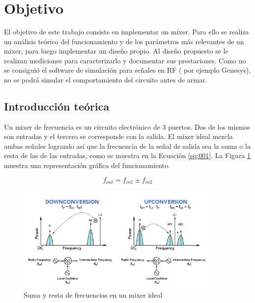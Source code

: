 \documentclass[a4paper,10pt]{article}
\title{  }
\begin{document}
	\maketitle %
	\newpage

	\tableofcontents %
	\newpage


\section{Objetivo}
\indent El objetivo de este trabajo consiste en implementar un mixer. Para ello 
se realiza un an\'alisis te\'orico del funcionamiento y de los par\'ametros 
m\'as relevantes de un mixer, para luego implementar un dise\~no propio. Al 
dise\~no propuesto se le realizan mediciones para caracterizarlo y documentar 
sus prestaciones.
\indent Como no se consiguió el software de simulación para señales en RF (
por ejemplo Genesys), no se podrá simular el comportamiento del circuito antes 
de armar.

\newpage
\subsection{Introducción teórica}
	\indent Un mixer de frecuencia es un circuito electrónico de 3 puertos. Dos
	de los mismos son entradas y el tercero se corresponde con la salida. El 
	mixer ideal mezcla ambas señales logrando así que la frecuencia de la señal 
	de salida sea la suma o la resta de las de las entradas, como se muestra en 
	la Ecuación \ref{eq:001}. La Figura \ref{img:001} muestra una representación
	gráfica del funcionamiento.
	
	\begin{equation}\label{eq:001}
		f_{out} = f_{in1} \pm f_{in2}
	\end{equation}

	\begin{figure}[!htb]
		\centering
		\includegraphics[width=10cm]
		{Images/MixerFunction.png}
		\caption{Suma y resta de frecuencias en un mixer ideal}
		\label{img:001} 
	\end{figure}
\end{document}
